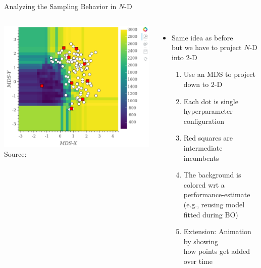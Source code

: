 \begin{frame}[c]{Analyzing the Sampling Behavior in $N$-D}


\begin{columns}
	
	\begin{center}
		\includegraphics[width=1.0\textwidth]{images/configurator_footprint0.png}\\
		Source: 
	\end{center}
	
	
	\begin{itemize}
		\item Same idea as before\\
		 but we have to project $N$-D into $2$-D
		 \pause
		\begin{enumerate}
			\item Use an MDS to project down to $2$-D
					 \pause
			\item Each dot is single hyperparameter configuration
					 \pause
			\item Red squares are intermediate incumbents
					 \pause
			\item The background is colored wrt a performance-estimate\\ (e.g., reusing model fitted during BO) 
					 \pause
			\item Extension: Animation by showing\\ how points get added over time
		\end{enumerate}
	\end{itemize}
	
\end{columns}

\end{frame}
